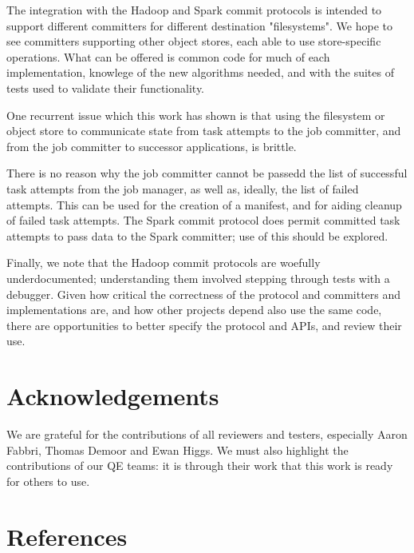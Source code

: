 \documentclass[conference]{IEEEtran}
\begin{document}
The integration with the Hadoop and Spark commit protocols is intended
to support different committers for different destination "filesystems".
We hope to see committers supporting other object stores, each
able to use store-specific operations.
What can be offered is common code for much of each implementation,
knowlege of the new algorithms needed, and
with the suites of tests used to validate their functionality.

One recurrent issue which this work has shown is that using the
filesystem or object store to communicate state from task attempts
to the job committer, and from the job committer to successor
applications, is brittle.

There is no reason why the job committer cannot be passedd the list of
successful task attempts from the job manager, as well as, ideally,
the list of failed attempts.
This can be used for the creation of a manifest, and for aiding cleanup
of failed task attempts.
The Spark commit protocol does permit committed task attempts to pass data
to the Spark committer;
use of this should be explored.



Finally, we note that the Hadoop commit protocols are woefully underdocumented;
understanding them involved stepping through tests with a debugger.
Given how critical the correctness of the protocol and committers and implementations
are, and how other projects depend also use the same code, there
are opportunities to better specify the protocol and APIs, and review
their use.


\section*{Acknowledgements}
\label{sec:acknowledgements}

We are grateful for the contributions of all reviewers and testers, especially
Aaron Fabbri, Thomas Demoor and Ewan Higgs.
We must also highlight the contributions of our QE teams: it is through
their work that this work is ready for others to use.


\section{References}
\label{sec:references}




\end{document}
